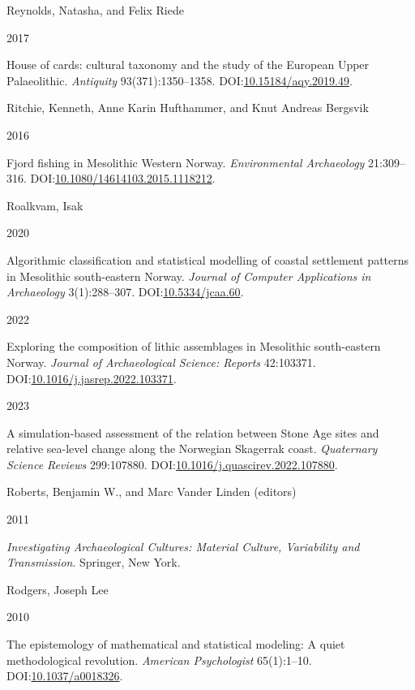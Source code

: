 \documentclass[
  a4paper,
  oneside]{uiophdthesis}
\newlength{\cslhangindent}
\newlength{\csllabelwidth}
\newlength{\cslentryspacingunit} %
\newenvironment{CSLReferences}[2] %
 {%
  \setlength{\parindent}{0pt}
  \ifodd #1
  \let\oldpar\par
  \def\par{\hangindent=\cslhangindent\oldpar}
  \fi
  \setlength{\parskip}{#2\cslentryspacingunit}
 }%
 {}
\newcommand{\CSLBlock}[1]{#1\hfill\break}
\newcommand{\CSLLeftMargin}[1]{\parbox[t]{\csllabelwidth}{#1}}
\newcommand{\CSLRightInline}[1]{\parbox[t]{\linewidth - \csllabelwidth}{#1}\break}
\begin{document}
\begin{CSLReferences}{0}{0}
\leavevmode{}%
\CSLBlock{Reynolds, Natasha, and Felix Riede}
\CSLLeftMargin{ 2017}
\CSLRightInline{{House of cards: cultural taxonomy and the study of the European Upper Palaeolithic}. \emph{Antiquity} 93(371):1350--1358. DOI:\href{https://doi.org/10.15184/aqy.2019.49}{10.15184/aqy.2019.49}.}

\leavevmode{}%
\CSLBlock{Ritchie, Kenneth, Anne Karin Hufthammer, and Knut Andreas Bergsvik}
\CSLLeftMargin{ 2016}
\CSLRightInline{{Fjord fishing in Mesolithic Western Norway}. \emph{Environmental Archaeology} 21:309--316. DOI:\href{https://doi.org/10.1080/14614103.2015.1118212}{10.1080/14614103.2015.1118212}.}

\leavevmode{}%
\CSLBlock{Roalkvam, Isak}
\CSLLeftMargin{ 2020}
\CSLRightInline{{Algorithmic classification and statistical modelling of coastal settlement patterns in Mesolithic south-eastern Norway}. \emph{Journal of Computer Applications in Archaeology} 3(1):288--307. DOI:\href{https://doi.org/10.5334/jcaa.60}{10.5334/jcaa.60}.}

\leavevmode{}%
\CSLLeftMargin{ 2022 }
\CSLRightInline{{Exploring the composition of lithic assemblages in Mesolithic south-eastern Norway}. \emph{Journal of Archaeological Science: Reports} 42:103371. DOI:\href{https://doi.org/10.1016/j.jasrep.2022.103371}{10.1016/j.jasrep.2022.103371}.}

\leavevmode{}%
\CSLLeftMargin{ 2023 }
\CSLRightInline{{A simulation-based assessment of the relation between Stone Age sites and relative sea-level change along the Norwegian Skagerrak coast}. \emph{Quaternary Science Reviews} 299:107880. DOI:\href{https://doi.org/10.1016/j.quascirev.2022.107880}{10.1016/j.quascirev.2022.107880}.}

\leavevmode{}%
\CSLBlock{Roberts, Benjamin W., and Marc Vander Linden (editors)}
\CSLLeftMargin{ 2011}
\CSLRightInline{\emph{{Investigating Archaeological Cultures: Material Culture, Variability and Transmission}}. Springer, New York.}

\leavevmode{}%
\CSLBlock{Rodgers, Joseph Lee}
\CSLLeftMargin{ 2010}
\CSLRightInline{{The epistemology of mathematical and statistical modeling: A quiet methodological revolution}. \emph{American Psychologist} 65(1):1--10. DOI:\href{https://doi.org/10.1037/a0018326}{10.1037/a0018326}.}


\end{CSLReferences}
\end{document}

